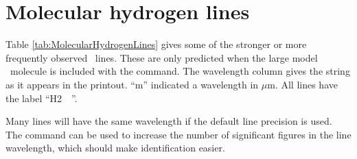 \section{Molecular hydrogen lines}

Table \ref{tab:MolecularHydrogenLines} gives some of the stronger
or more frequently observed \htwo\ lines.
These are only predicted when the large model \htwo\ molecule is
included with the  command.
The wavelength column gives the string
as it appears in the printout.  ``m'' indicated a wavelength in $\mu$m.
All lines have the label ``H2~~''.

Many lines will have the same wavelength if the default line precision is used.
The  command can be used 
to increase the number of significant figures in the
line wavelength, which should make identification easier.


